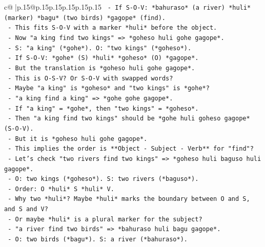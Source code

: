 \documentclass{article}
\begin{document}
{\begin{supertabular}{c@{$\;$}|p{.15\linewidth}@{}p{.15\linewidth}p{.15\linewidth}p{.15\linewidth}p{.15\linewidth}p{.15\linewidth}}
{{{\texttt{                  {-} If S{-}O{-}V: *bahuraso* (a river) *huli* (marker) *bagu* (two birds) *gagope* (find).} \\
\texttt{                  {-} This fits S{-}O{-}V with a marker *huli* before the object.} \\
\texttt{                  {-} Now "a king find two kings" => *goheso huli gohe gagope*.} \\
\texttt{                    {-} S: "a king" (*gohe*). O: "two kings" (*goheso*).} \\
\texttt{                    {-} If S{-}O{-}V: *gohe* (S) *huli* *goheso* (O) *gagope*.} \\
\texttt{                    {-} But the translation is *goheso huli gohe gagope*.} \\
\texttt{                    {-} This is O{-}S{-}V? Or S{-}O{-}V with swapped words?} \\
\texttt{                    {-} Maybe "a king" is *goheso* and "two kings" is *gohe*?} \\
\texttt{                    {-} "a king find a king" => *gohe gohe gagope*.} \\
\texttt{                    {-} If "a king" = *gohe*, then "two kings" = *goheso*.} \\
\texttt{                    {-} Then "a king find two kings" should be *gohe huli goheso gagope* (S{-}O{-}V).} \\
\texttt{                    {-} But it is *goheso huli gohe gagope*.} \\
\texttt{                    {-} This implies the order is **Object {-} Subject {-} Verb** for "find"?} \\
\texttt{                    {-} Let's check "two rivers find two kings" => *goheso huli baguso huli gagope*.} \\
\texttt{                      {-} O: two kings (*goheso*). S: two rivers (*baguso*).} \\
\texttt{                      {-} Order: O *huli* S *huli* V.} \\
\texttt{                      {-} Why two *huli*? Maybe *huli* marks the boundary between O and S, and S and V?} \\
\texttt{                      {-} Or maybe *huli* is a plural marker for the subject?} \\
\texttt{                      {-} "a river find two birds" => *bahuraso huli bagu gagope*.} \\
\texttt{                        {-} O: two birds (*bagu*). S: a river (*bahuraso*).} \\
}}}
\end{supertabular}}
\end{document}
